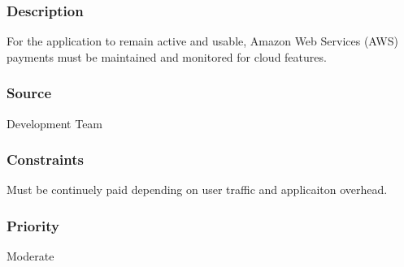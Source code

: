 \subsubsection{Description}
For the application to remain active and usable, Amazon Web Services (AWS) payments must be maintained and monitored for cloud features.
\subsubsection{Source}
Development Team
\subsubsection{Constraints}
Must be continuely paid depending on user traffic and applicaiton overhead.
\subsubsection{Priority}
Moderate

